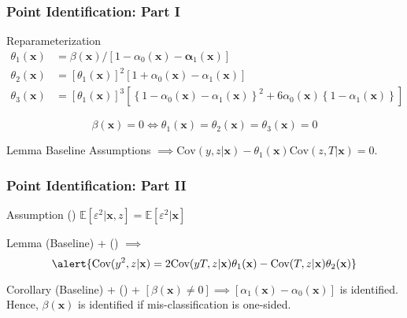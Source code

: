 \documentclass{beamer}
\begin{document}
\begin{frame}
  \frametitle{Point Identification: Part I}


  \vspace{-1em}

  \begin{block}{Reparameterization}
    \vspace{-1em}
\begin{align*}
  \theta_1(\mathbf{x}) &= \beta(\mathbf{x})/\left[ 1 - \alpha_0(\mathbf{x}) - \mathbf{\alpha}_1(\mathbf{x})  \right]\\
  \theta_2(\mathbf{x}) &= \left[\theta_1(\mathbf{x})\right]^2 \left[ 1 + \alpha_0(\mathbf{x}) - \alpha_1(\mathbf{x})\right] \\
  \theta_3(\mathbf{x}) &= \left[\theta_1(\mathbf{x})\right]^3\left[ \left\{ 1 - \alpha_0(\mathbf{x}) - \alpha_1(\mathbf{x}) \right\}^2 + 6\alpha_0(\mathbf{x})\left\{ 1 - \alpha_1(\mathbf{x}) \right\} \right]
\end{align*}

\[\boxed{\beta(\mathbf{x}) = 0 \iff \theta_1(\mathbf{x}) = \theta_2(\mathbf{x}) = \theta_3(\mathbf{x}) = 0}\]
  \end{block}

  \vspace{-1.5em}

  \begin{block}{Lemma}
    Baseline Assumptions $\implies \mbox{Cov}(y,z|\mathbf{x}) - \theta_1(\mathbf{x}) \mbox{Cov}(z,T|\mathbf{x}) = 0$.
  \end{block}

\end{frame}
\begin{frame}
  \frametitle{Point Identification: Part II}

  \begin{block}{Assumption (\spadesuit)}
    $\mathbb{E}[\varepsilon^2|\mathbf{x},z] = \mathbb{E}[\varepsilon^2|\mathbf{x}]$
  \end{block}

  \begin{block}{Lemma}
    (Baseline) + (\spadesuit) $\implies$ 
    \[
      \alert{\mbox{Cov}(y^2,z|\mathbf{x}) = 2\mbox{Cov}(yT,z|\mathbf{x}) \theta_1(\mathbf{x}) -\mbox{Cov}(T,z|\mathbf{x})\theta_2(\mathbf{x})}
    \]
  \end{block}

  \begin{block}{Corollary}
    (Baseline) + (\spadesuit) + $[\beta(\mathbf{x})\neq 0] \implies \left[ \alpha_1(\mathbf{x}) - \alpha_0(\mathbf{x}) \right]$ is identified. Hence, $\beta(\mathbf{x})$ is identified if mis-classification is one-sided.
  \end{block}
    

  
\end{frame}
\end{document}
